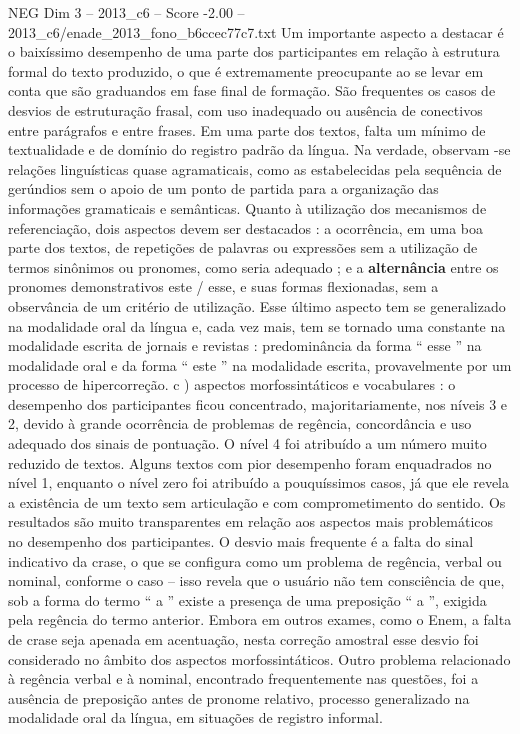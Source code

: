 \begin{textsample}{NEG Dim 3 – 2013\_c6 – Score -2.00 – 2013\_c6/enade\_2013\_fono\_b6ccec77c7.txt}
Um importante aspecto a destacar é o baixíssimo desempenho de uma parte dos participantes em relação à estrutura formal do texto produzido, o que é extremamente preocupante ao se levar em conta que são graduandos em fase final de formação.
São frequentes os casos de desvios de estruturação frasal, com uso inadequado ou ausência de conectivos entre parágrafos e entre frases.
Em uma parte dos textos, falta um mínimo de textualidade e de domínio do registro padrão da língua.
Na verdade, observam -se relações linguísticas quase agramaticais, como as estabelecidas pela sequência de gerúndios sem o apoio de um ponto de partida para a organização das informações gramaticais e semânticas.
Quanto à utilização dos mecanismos de referenciação, dois aspectos devem ser destacados : a ocorrência, em uma boa parte dos textos, de repetições de palavras ou expressões sem a utilização de termos sinônimos ou pronomes, como seria adequado ; e a \textbf{alternância} entre os pronomes demonstrativos este / esse, e suas formas flexionadas, sem a observância de um critério de utilização.
Esse último aspecto tem se generalizado na modalidade oral da língua e, cada vez mais, tem se tornado uma constante na modalidade escrita de jornais e revistas : predominância da forma “ esse ” na modalidade oral e da forma “ este ” na modalidade escrita, provavelmente por um processo de hipercorreção. c ) aspectos morfossintáticos e vocabulares : o desempenho dos participantes ficou concentrado, majoritariamente, nos níveis 3 e 2, devido à grande ocorrência de problemas de regência, concordância e uso adequado dos sinais de pontuação.
O nível 4 foi atribuído a um número muito reduzido de textos.
Alguns textos com pior desempenho foram enquadrados no nível 1, enquanto o nível zero foi atribuído a pouquíssimos casos, já que ele revela a existência de um texto sem articulação e com comprometimento do sentido.
Os resultados são muito transparentes em relação aos aspectos mais problemáticos no desempenho dos participantes.
O desvio mais frequente é a falta do sinal indicativo da crase, o que se configura como um problema de regência, verbal ou nominal, conforme o caso – isso revela que o usuário não tem consciência de que, sob a forma do termo “ a ” existe a presença de uma preposição “ a ”, exigida pela regência do termo anterior.
Embora em outros exames, como o Enem, a falta de crase seja apenada em acentuação, nesta correção amostral esse desvio foi considerado no âmbito dos aspectos morfossintáticos.
Outro problema relacionado à regência verbal e à nominal, encontrado frequentemente nas questões, foi a ausência de preposição antes de pronome relativo, processo generalizado na modalidade oral da língua, em situações de registro informal.

\end{textsample}
